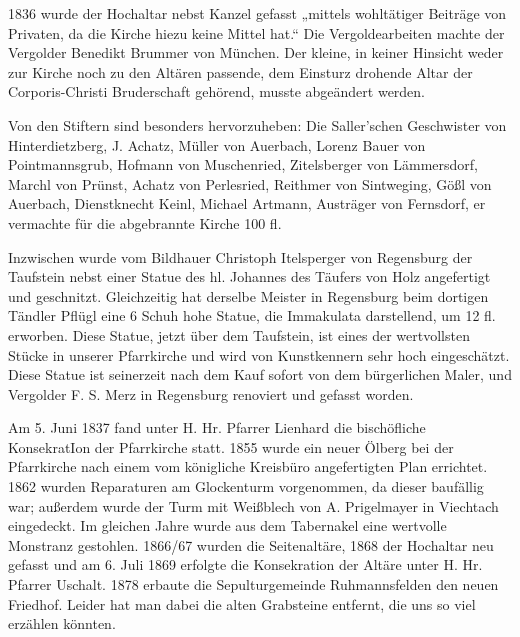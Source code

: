 \documentclass[12pt,a4paper]{book}
\begin{document}
1836 wurde der Hochaltar nebst Kanzel gefasst „mittels wohltätiger Beiträge von
Privaten, da die Kirche hiezu keine Mittel hat.“ Die Vergoldearbeiten machte der
Vergolder Benedikt Brummer von München. Der kleine, in keiner Hinsicht weder zur
Kirche noch zu den Altären passende, dem Einsturz drohende Altar der
Corporis-Christi Bruderschaft gehörend, musste abgeändert werden.

Von den Stiftern sind besonders hervorzuheben: Die Saller'schen Geschwister von
Hinterdietzberg, J. Achatz, Müller von Auerbach, Lorenz Bauer von
Pointmannsgrub, Hofmann von Muschenried, Zitelsberger von Lämmersdorf, Marchl
von Prünst, Achatz von Perlesried, Reithmer von Sintweging, Gößl von Auerbach,
Dienstknecht Keinl, Michael Artmann, Austräger von Fernsdorf, er vermachte für
die abgebrannte Kirche 100 fl.

Inzwischen wurde vom Bildhauer Christoph Itelsperger von Regensburg der
Taufstein nebst einer Statue des hl. Johannes des Täufers von Holz angefertigt
und geschnitzt. Gleichzeitig hat derselbe Meister in Regensburg beim dortigen
Tändler Pflügl eine 6 Schuh hohe Statue, die Immakulata darstellend, um 12 fl.
erworben. Diese Statue, jetzt über dem Taufstein, ist eines der wertvollsten
Stücke in unserer Pfarrkirche und wird von Kunstkennern sehr hoch eingeschätzt.
Diese Statue ist seinerzeit nach dem Kauf sofort von dem bürgerlichen Maler, und
Vergolder F. S. Merz in Regensburg renoviert und gefasst worden.

Am 5. Juni 1837 fand unter H. Hr. Pfarrer Lienhard die bischöfliche KonsekratIon
der Pfarrkirche statt. 1855 wurde ein neuer Ölberg bei der Pfarrkirche nach
einem vom königliche Kreisbüro angefertigten Plan errichtet. 1862 wurden
Reparaturen am Glockenturm vorgenommen, da dieser baufällig war; außerdem wurde
der Turm mit Weißblech von A. Prigelmayer in Viechtach eingedeckt. Im gleichen
Jahre wurde aus dem Tabernakel eine wertvolle Monstranz gestohlen. 1866/67
wurden die Seitenaltäre, 1868 der Hochaltar neu gefasst und am 6. Juli 1869
erfolgte die Konsekration der Altäre unter H. Hr. Pfarrer Uschalt. 1878 erbaute
die Sepulturgemeinde Ruhmannsfelden den neuen Friedhof. Leider hat man dabei die
alten Grabsteine entfernt, die uns so viel erzählen könnten.
\end{document}
